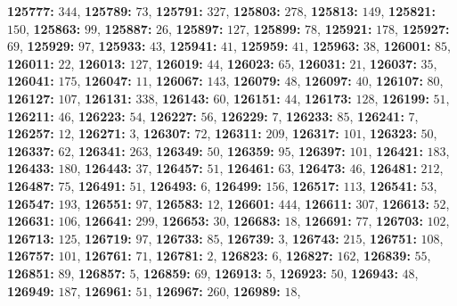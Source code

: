 \textsf{\bfseries 125777:} $344$, \textsf{\bfseries 125789:} $73$, \textsf{\bfseries 125791:} $327$, \textsf{\bfseries 125803:} $278$, \textsf{\bfseries 125813:} $149$, \textsf{\bfseries 125821:} $150$, \textsf{\bfseries 125863:} $99$, \textsf{\bfseries 125887:} $26$, \textsf{\bfseries 125897:} $127$, \textsf{\bfseries 125899:} $78$, \textsf{\bfseries 125921:} $178$, \textsf{\bfseries 125927:} $69$, \textsf{\bfseries 125929:} $97$, \textsf{\bfseries 125933:} $43$, \textsf{\bfseries 125941:} $41$, \textsf{\bfseries 125959:} $41$, \textsf{\bfseries 125963:} $38$, \textsf{\bfseries 126001:} $85$, \textsf{\bfseries 126011:} $22$, \textsf{\bfseries 126013:} $127$, \textsf{\bfseries 126019:} $44$, \textsf{\bfseries 126023:} $65$, \textsf{\bfseries 126031:} $21$, \textsf{\bfseries 126037:} $35$, \textsf{\bfseries 126041:} $175$, \textsf{\bfseries 126047:} $11$, \textsf{\bfseries 126067:} $143$, \textsf{\bfseries 126079:} $48$, \textsf{\bfseries 126097:} $40$, \textsf{\bfseries 126107:} $80$, \textsf{\bfseries 126127:} $107$, \textsf{\bfseries 126131:} $338$, \textsf{\bfseries 126143:} $60$, \textsf{\bfseries 126151:} $44$, \textsf{\bfseries 126173:} $128$, \textsf{\bfseries 126199:} $51$, \textsf{\bfseries 126211:} $46$, \textsf{\bfseries 126223:} $54$, \textsf{\bfseries 126227:} $56$, \textsf{\bfseries 126229:} $7$, \textsf{\bfseries 126233:} $85$, \textsf{\bfseries 126241:} $7$, \textsf{\bfseries 126257:} $12$, \textsf{\bfseries 126271:} $3$, \textsf{\bfseries 126307:} $72$, \textsf{\bfseries 126311:} $209$, \textsf{\bfseries 126317:} $101$, \textsf{\bfseries 126323:} $50$, \textsf{\bfseries 126337:} $62$, \textsf{\bfseries 126341:} $263$, \textsf{\bfseries 126349:} $50$, \textsf{\bfseries 126359:} $95$, \textsf{\bfseries 126397:} $101$, \textsf{\bfseries 126421:} $183$, \textsf{\bfseries 126433:} $180$, \textsf{\bfseries 126443:} $37$, \textsf{\bfseries 126457:} $51$, \textsf{\bfseries 126461:} $63$, \textsf{\bfseries 126473:} $46$, \textsf{\bfseries 126481:} $212$, \textsf{\bfseries 126487:} $75$, \textsf{\bfseries 126491:} $51$, \textsf{\bfseries 126493:} $6$, \textsf{\bfseries 126499:} $156$, \textsf{\bfseries 126517:} $113$, \textsf{\bfseries 126541:} $53$, \textsf{\bfseries 126547:} $193$, \textsf{\bfseries 126551:} $97$, \textsf{\bfseries 126583:} $12$, \textsf{\bfseries 126601:} $444$, \textsf{\bfseries 126611:} $307$, \textsf{\bfseries 126613:} $52$, \textsf{\bfseries 126631:} $106$, \textsf{\bfseries 126641:} $299$, \textsf{\bfseries 126653:} $30$, \textsf{\bfseries 126683:} $18$, \textsf{\bfseries 126691:} $77$, \textsf{\bfseries 126703:} $102$, \textsf{\bfseries 126713:} $125$, \textsf{\bfseries 126719:} $97$, \textsf{\bfseries 126733:} $85$, \textsf{\bfseries 126739:} $3$, \textsf{\bfseries 126743:} $215$, \textsf{\bfseries 126751:} $108$, \textsf{\bfseries 126757:} $101$, \textsf{\bfseries 126761:} $71$, \textsf{\bfseries 126781:} $2$, \textsf{\bfseries 126823:} $6$, \textsf{\bfseries 126827:} $162$, \textsf{\bfseries 126839:} $55$, \textsf{\bfseries 126851:} $89$, \textsf{\bfseries 126857:} $5$, \textsf{\bfseries 126859:} $69$, \textsf{\bfseries 126913:} $5$, \textsf{\bfseries 126923:} $50$, \textsf{\bfseries 126943:} $48$, \textsf{\bfseries 126949:} $187$, \textsf{\bfseries 126961:} $51$, \textsf{\bfseries 126967:} $260$, \textsf{\bfseries 126989:} $18$, 
